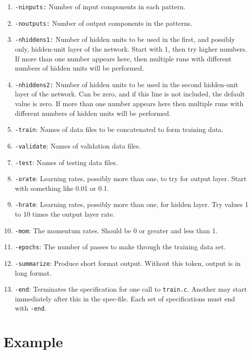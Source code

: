 \begin{enumerate}
\item \verb'-ninputs:' Number of input components in each pattern.
\item \verb'-noutputs:' Number of output components in the patterns.
\item \verb'-nhiddens1:' Number of hidden units to be used in
the first, and possibly only, hidden-unit layer of the network.  Start with 1,
then try  higher numbers. If more than one number appears
here, then multiple runs with different numbers of hidden units will be
performed. 
\item \verb'-nhiddens2:' Number of hidden units to be used in
the second hidden-unit layer of the network.  Can be zero, and if this line is
not included, the default value is zero.  If more than one number appears
here then multiple runs with different numbers of hidden units will be
performed. 
\item \verb'-train': Names of data files to be concatenated to form training data.
\item \verb'-validate': Names of validation data files.
\item \verb'-test': Names of testing data files.
\item \verb'-orate': Learning rates, possibly more than one, to try  for
output layer.  Start 
with something like 0.01 or 0.1.
\item \verb'-hrate': Learning rates, possibly more than one, for hidden layer.
Try values 1 to 10 times the output layer rate.
\item \verb'-mom': The momentum rates.  Should be 0 or greater and
less than 1.  
\item \verb'-epochs': The number of passes to make through the training
data set.
\item \verb'-summarize': Produce short format output.  Without this token,
output is in long format.
\item \verb'-end': Terminates the specification for one call to
\verb'train.c'. Another may start immediately after this in the spec-file.
Each set of specifications must end with \verb'-end'.
\end{enumerate}

\section{Example}

